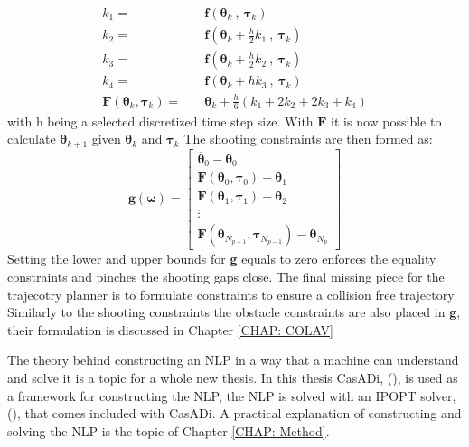 \begin{equation}
    \label{EQ: RK4}
    \begin{split}
    k_1 = \quad & \textbf{f}(\bm{\theta}_{k} \ , \ \bm{\tau}_k) \\
    k_2 = \quad & \textbf{f}(\bm{\theta}_{k} + \frac{h}{2}k_1 \ , \ \bm{\tau}_k) \\
    k_3 = \quad & \textbf{f}(\bm{\theta}_{k} + \frac{h}{2}k_2 \ , \ \bm{\tau}_k) \\ 
    k_4 = \quad & \textbf{f}(\bm{\theta}_{k} + h k_3 \ , \ \bm{\tau}_k) \\ 
    \textbf{F}(\bm{\theta}_{k}, \bm{\tau}_k) = \quad & \bm{\theta}_k + \frac{h}{6} (k_1 + 2k_2 + 2k_3 + k_4)
    \end{split}
\end{equation}
with h being a selected discretized time step size. With $\textbf{F}$ it is now possible to calculate $\bm{\theta}_{k+1}$ given $\bm{\theta}_k$ and $\bm{\tau}_k$
The shooting constraints are then formed as:
\begin{equation}
    \textbf{g}(\bm{\omega}) = \begin{bmatrix}
                            \overline{\bm{\theta}}_0 - \bm{\theta}_0 \\[-5pt]
                            \textbf{F}(\bm{\theta}_{0}, \bm{\tau}_0) - \bm{\theta}_1 \\[-5pt]
                            \textbf{F}(\bm{\theta}_{1}, \bm{\tau}_1) - \bm{\theta}_2 \\[-5pt]
                            \vdots \\[-5pt]
                            \textbf{F}(\bm{\theta}_{N_{p-1}}, \bm{\tau}_{N_{p-1}}) - \bm{\theta}_{N_{p}}
                             \end{bmatrix}
\end{equation}
Setting the lower and upper bounds for \textbf{g} equals to zero enforces the equality constraints and pinches the shooting gaps close. The final missing piece for the trajecotry planner
is to formulate constraints to ensure a collision free trajectory. Similarly to the shooting constraints the obstacle constraints are also placed in \textbf{g}, their
formulation is discussed in Chapter \ref{CHAP: COLAV}

The theory behind constructing an \gls{NLP} in a way that a machine can understand and solve it is a topic for a whole new thesis. In this thesis CasADi, (\cite{andersson2019casadi}), is used
as a framework for constructing the NLP, the NLP is solved with an \gls{IPOPT} solver, (\cite{wachter2006implementation}), that comes included with CasADi. A practical
explanation of constructing and solving the NLP is the topic of Chapter \ref{CHAP: Method}.

